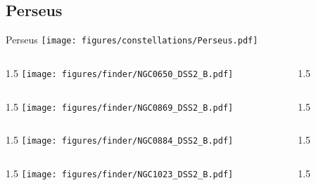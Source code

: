 \documentclass[final]{beamer}
\newlength{\colwidth}
\begin{document}
\subsection{Perseus}

\begin{frame}[t]{\LARGE Perseus}
  \centering
  \texttt{[image: figures/constellations/Perseus.pdf]}
\end{frame}


\begin{frame}[t]{}
  \begin{columns}[T]
    \begin{column}{1.5\colwidth}
      \centering
      \texttt{[image: figures/finder/NGC0650\_DSS2\_B.pdf]}
    \end{column}
    \begin{column}{1.5\colwidth}
      \Large
      
    \end{column}
  \end{columns}
  \vspace{\fill}
  \begin{columns}[T]
    \begin{column}{1.5\colwidth}
      \centering
      \texttt{[image: figures/finder/NGC0869\_DSS2\_B.pdf]}
    \end{column}
    \begin{column}{1.5\colwidth}
      \Large
      
    \end{column}
  \end{columns}
\end{frame}

\begin{frame}[t]{}
  \begin{columns}[T]
    \begin{column}{1.5\colwidth}
      \centering
      \texttt{[image: figures/finder/NGC0884\_DSS2\_B.pdf]}
    \end{column}
    \begin{column}{1.5\colwidth}
      \Large
      
    \end{column}
  \end{columns}
  \vspace{\fill}
  \begin{columns}[T]
    \begin{column}{1.5\colwidth}
      \centering
      \texttt{[image: figures/finder/NGC1023\_DSS2\_B.pdf]}
    \end{column}
    \begin{column}{1.5\colwidth}
      \Large
      
    \end{column}
  \end{columns}
\end{frame}
\end{document}
